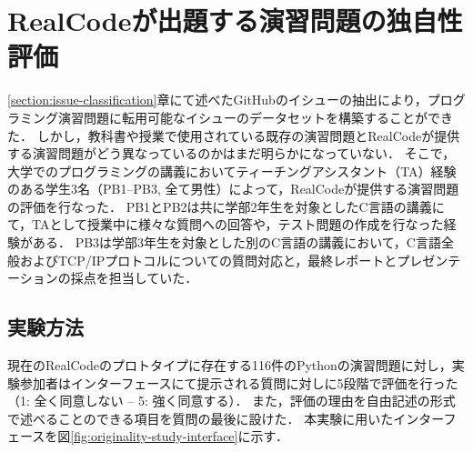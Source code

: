 \chapter{RealCodeが出題する演習問題の独自性評価}
\graphicspath{{Chapters_evaluation/Figs/}}
\label{section:ta_evaluation}


\ref{section:issue-classification}章にて述べたGitHubのイシューの抽出により，プログラミング演習問題に転用可能なイシューのデータセットを構築することができた．
しかし，教科書や授業で使用されている既存の演習問題とRealCodeが提供する演習問題がどう異なっているのかはまだ明らかになっていない．
そこで，大学でのプログラミングの講義においてティーチングアシスタント（TA）経験のある学生3名（PB1--PB3, 全て男性）によって，RealCodeが提供する演習問題の評価を行なった．
PB1とPB2は共に学部2年生を対象としたC言語の講義にて，TAとして授業中に様々な質問への回答や，テスト問題の作成を行なった経験がある．
PB3は学部3年生を対象とした別のC言語の講義において，C言語全般およびTCP/IPプロトコルについての質問対応と，最終レポートとプレゼンテーションの採点を担当していた．


\section{実験方法}
現在のRealCodeのプロトタイプに存在する116件のPythonの演習問題に対し，実験参加者はインターフェースにて提示される質問に対しに5段階で評価を行った（1: 全く同意しない -- 5: 強く同意する）．
また，評価の理由を自由記述の形式で述べることのできる項目を質問の最後に設けた．
本実験に用いたインターフェースを図\ref{fig:originality-study-interface}に示す．

